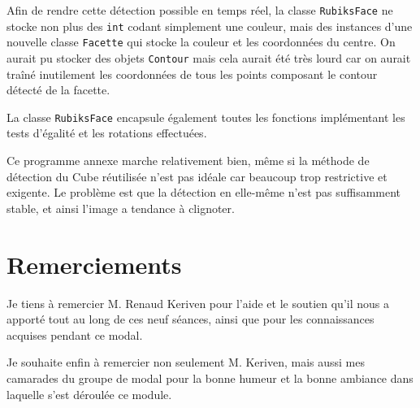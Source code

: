 \documentclass[a4paper,11pt]{article}
\begin{document}
Afin de rendre cette détection possible en temps réel, la classe \verb|RubiksFace| ne stocke non plus des \verb|int|
codant simplement une couleur, mais des instances d'une nouvelle classe \verb|Facette| qui stocke la couleur et
les coordonnées du centre. On aurait pu stocker des objets \verb|Contour| mais cela aurait été très lourd car
on aurait traîné inutilement les coordonnées de tous les points composant le contour détecté de la facette.

La classe \verb|RubiksFace| encapsule également toutes les fonctions implémentant les tests d'égalité et les 
rotations effectuées.

Ce programme annexe marche relativement bien, même si la méthode de détection du Cube réutilisée n'est pas
idéale car beaucoup trop restrictive et exigente. Le problème est que la détection en elle-même n'est pas suffisamment
stable, et ainsi l'image a tendance à clignoter.

\section{Remerciements}
Je tiens à remercier M. Renaud Keriven pour l'aide et le soutien qu'il nous a apporté tout au long de ces neuf
séances, ainsi que pour les connaissances acquises pendant ce modal.

Je souhaite enfin à remercier non seulement M. Keriven, mais aussi mes camarades du groupe de modal pour la 
bonne humeur et la bonne ambiance dans laquelle s'est déroulée ce module.
\end{document}
